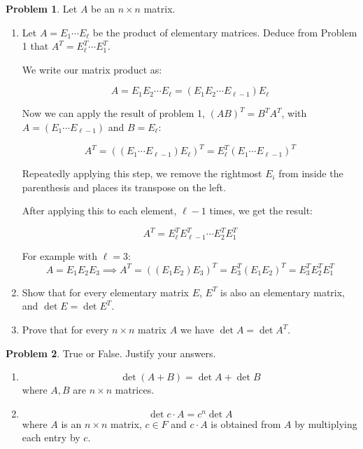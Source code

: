 \documentclass[12pt, oneside]{amsart}
\theoremstyle{definition}
\newtheorem{prob}{Problem}
\begin{document}
\begin{prob} Let $A$ be an $n\times n$ matrix. 
    \begin{enumerate}
    \item Let $A = E_1\cdots E_\ell$ be the product of elementary matrices. Deduce from Problem 1 that $A^T = E_\ell^T \cdots E_1^T$.
    
    \begin{solution}
    
    
    We write our matrix product as: 
    
    \[
    A = E_1 E_2 \cdots E_\ell = (E_1 E_2 \cdots E_{\ell-1}) E_\ell
    \]

    Now we can apply the result of problem 1, $(AB)^T = B^T A^T$, with $A = (E_1 \cdots E_{\ell-1})$ and $B = E_\ell$:
    
    
    \[
      A^T = ((E_1 \cdots E_{\ell-1}) E_\ell)^T = E_\ell^T (E_1 \cdots E_{\ell-1})^T
    \]
    
    Repeatedly applying this step, we remove the rightmost $E_i$ from inside the parenthesis and places its transpose on the left. 

    After applying this to each element, $\ell-1$ times, we get the result:

    \[
      A^T = E_\ell^T E_{\ell-1}^T \cdots E_2^T E_1^T
    \]
    
    For example with $\ell = 3$:
    \[
      A = E_1 E_2 E_3 \implies A^T = ((E_1 E_2) E_3)^T = E_3^T (E_1 E_2)^T = E_3^T E_2^T E_1^T
    \]
    \end{solution}
    
    \item Show that for every elementary matrix $E$, $E^T$ is also an elementary matrix, and $\det E = \det E^T$.
    
    \item Prove that for every $n\times n$ matrix $A$ we have $\det A = \det A^T$.
    \end{enumerate}
\end{prob}

\begin{prob} True or False. Justify your answers.
\begin{enumerate}
    \item  $$\det (A+B) = \det A  +\det B$$ where $A,B$ are $n\times n$ matrices.
    
    \item $$\det c\cdot A = c^n \det A$$ where $A$ is an $n\times n$ matrix, $c\in F$ and $c\cdot A$ is obtained from $A$ by multiplying each entry by $c$.
\end{enumerate}
\end{prob}
\end{document}
